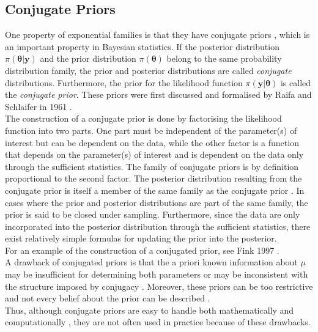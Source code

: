 \subsection{Conjugate Priors}
One property of exponential families is that they have conjugate priors \autocite[][]{diaconis1979conjugate}, which is an important property in Bayesian statistics. If the posterior distribution $\pi\left(\pmb{\theta}|\pmb{y}\right)$ and the prior distribution $\pi\left(\pmb{\theta}\right)$ belong to the same probability distribution family, the prior and posterior distributions are called \textit{conjugate} distributions. Furthermore, the prior for the likelihood function $\pi\left(\pmb{y}|\pmb{\theta}\right)$ is called the \textit{conjugate prior}. These priors were first discussed and formalised by Raifa and Schlaifer in 1961 \autocite[][]{raiffaapplied}. \\
The construction of a conjugate prior is done by factorising the likelihood function into two parts. One part must be independent of the parameter(s) of interest but can be dependent on the data, while the other factor is a function that depends on the parameter(s) of interest and is dependent on the data only through the sufficient statistics. The family of conjugate priors is by definition proportional to the second factor. The posterior distribution resulting from the conjugate prior is itself a member of the same family as the conjugate prior \autocite[][]{raiffaapplied}. In cases where the prior and posterior distributions are part of the same family, the prior is said to be closed under sampling. Furthermore, since the data are only incorporated into the posterior distribution through the sufficient statistics, there exist relatively simple formulas for updating the prior into the posterior.\\
For an example of the construction of a conjugated prior, see Fink 1997 \autocite[][]{fink1997compendium}.\\
A drawback of conjugated priors is that the a priori known information about $\mu$ may be insufficient for determining both parameters or may be inconsistent with the structure imposed by conjugacy \autocite[][]{robert2010bayesian}. Moreover, these priors can be too restrictive and not every belief about the prior can be described \autocite[][]{irwin2005prior}. \\
Thus, although conjugate priors are easy to handle both mathematically and computationally \autocite[][]{irwin2005prior}, they are not often used in practice because of these drawbacks.
